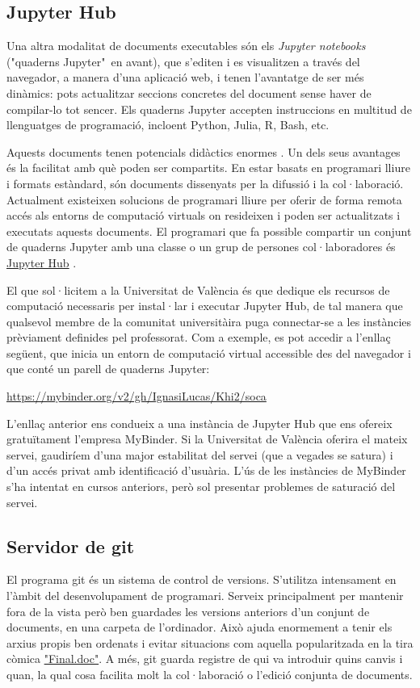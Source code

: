 \documentclass[a4paper,12pt]{article}
\begin{document}
\subsection{Jupyter Hub}
Una altra modalitat de documents executables són els \emph{Jupyter notebooks}
("quaderns Jupyter"\ en avant), que s'editen
i es visualitzen a través del navegador, a manera d'una aplicació web, i tenen l'avantatge
de ser més dinàmics: pots actualitzar seccions concretes del document sense haver de compilar-lo
tot sencer. Els quaderns Jupyter accepten instruccions en multitud de llenguatges de
programació, incloent Python, Julia, \textsf{R}, Bash, etc.

Aquests documents tenen potencials didàctics enormes \cite{Barba2019}. Un dels seus avantages
és la facilitat amb què poden ser compartits. En estar basats en programari lliure i formats
estàndard, són documents dissenyats per la difussió i la col·laboració. Actualment existeixen
solucions de programari lliure per oferir de forma remota accés als entorns de computació
virtuals on resideixen i poden ser actualitzats i executats aquests documents. El programari
que fa possible compartir un conjunt de quaderns Jupyter amb una classe o un grup
de persones col·laboradores és \href{https://jupyter.org/hub}{Jupyter Hub} \cite{JupyterHub}.

El que sol·licitem a la Universitat de València és que dedique els recursos
de computació necessaris per instal·lar i executar Jupyter Hub, de tal manera que qualsevol
membre de la comunitat universitàira puga connectar-se a les instàncies prèviament
definides pel professorat. Com a exemple, es pot accedir a l'enllaç següent, que
inicia un entorn de computació virtual accessible des del navegador i que conté un parell
de quaderns Jupyter:

\href{https://mybinder.org/v2/gh/IgnasiLucas/Khi2/soca}{https://mybinder.org/v2/gh/IgnasiLucas/Khi2/soca}

L'enllaç anterior ens condueix a una instància de Jupyter Hub que ens ofereix gratuïtament
l'empresa MyBinder. Si la Universitat de València oferira el mateix servei, gaudiríem d'una
major estabilitat del servei (que a vegades se satura) i d'un accés privat amb identificació
d'usuària. L'ús de les instàncies de MyBinder s'ha intentat en cursos anteriors, però sol
presentar problemes de saturació del servei.

\subsection{Servidor de \textsf{git}}
El programa \textsf{git} és un sistema de control de versions. S'utilitza intensament en
l'àmbit del desenvolupament de programari. Serveix principalment per mantenir fora de la
vista però ben guardades les versions anteriors d'un conjunt de documents, en una carpeta
de l'ordinador. Això ajuda enormement a tenir els arxius propis ben ordenats i evitar
situacions com aquella popularitzada en la tira còmica
\href{https://phdcomics.com/comics/archive.php?comicid=1531}{"Final.doc"}. A més, \textsf{git}
guarda registre de qui va introduir quins canvis i quan, la qual cosa facilita molt la
col·laboració o l'edició conjunta de documents.
\end{document}
